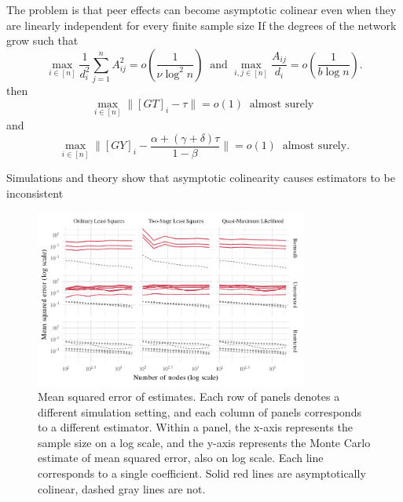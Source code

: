\documentclass[final]{beamer}
\newlength{\colwidth}
\begin{document}
\begin{frame}[t]
\begin{columns}[t]
\begin{column}{\colwidth}
\begin{block}{The problem is that peer effects can become asymptotic colinear even when they are linearly independent for every finite sample size}
                If the degrees of the network grow such that
                \begin{equation} \label{eq:growth:nub}
                    \max_{i \in [n] } \frac{1}{d_i^2} \sum_{j=1}^n A_{ij}^2
                    = o\left( \frac{ 1 }{ \nu \log^2 n } \right)
                    ~\text{ and }
                    \max_{i,j \in [n]} \frac{ A_{ij} }{ d_i }
                    = o\left( \frac{ 1 }{ b \log n } \right).
                \end{equation}
                then
                \begin{equation*}
                    \max_{i \in [n]} \Big\| [GT]_i - \tau \Big\|
                    = o(1) ~ \text{ almost surely }
                \end{equation*}
                and
                \begin{equation*}
                    \max_{i \in [n]} \Big\| [GY]_i - \frac{ \alpha + (\gamma+\delta)\tau }{ 1-\beta } \Big\|
                    = o(1) ~ \text{ almost surely.}
                \end{equation*}
            \end{block}

            \begin{block}{Simulations and theory show that asymptotic colinearity causes estimators to be inconsistent}
                \begin{figure}
                    \centering
                    \includegraphics[width=0.8\textwidth]{./figures/simulations/biometrika-mse-all.pdf}
                    \caption{Mean squared error of estimates. Each row of panels denotes a different simulation setting, and each column of panels corresponds to a different estimator. Within a panel, the x-axis represents the sample size on a log scale, and the y-axis represents the Monte Carlo estimate of mean squared error, also on log scale. Each line corresponds to a single coefficient. Solid red lines are asymptotically colinear, dashed gray lines are not.}
                    \label{fig:mse}
                \end{figure}


\end{block}
\end{column}
\end{columns}
\end{frame}
\end{document}
